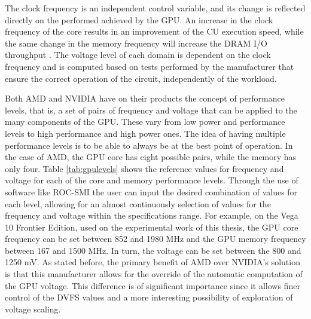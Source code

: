 The clock frequency is an independent control variable, and its change is reflected directly on the performed achieved by the GPU. An increase in the clock frequency of the core results in an improvement of the CU execution speed, while the same change in the memory frequency will increase the DRAM I/O throughput \cite{mei_survey_2016}. The voltage level of each domain is dependent on the clock frequency and is computed based on tests performed by the manufacturer that ensure the correct operation of the circuit, independently of the workload.

Both AMD and NVIDIA have on their products the concept of performance levels, that is, a set of pairs of frequency and voltage that can be applied to the many components of the GPU. These vary from low power and performance levels to high performance and high power ones. The idea of having multiple performance levels is to be able to always be at the best point of operation.  In the case of AMD, the GPU core has eight possible pairs, while the memory has only four. Table \ref{tab:gpulevels} shows the reference values for frequency and voltage for each of the core and memory performance levels. Through the use of software like ROC-SMI \cite{noauthor_radeonopencompute/roc-smi_2019} the user can input the desired combination of values for each level, allowing for an almost continuously selection of values for the frequency and voltage within the specifications range. For example, on the Vega 10 Frontier Edition, used on the experimental work of this thesis, the GPU core frequency can be set between 852 and 1980 MHz and the GPU memory frequency between 167 and 1500 MHz. In turn, the voltage can be set between the 800 and 1250 mV. As stated before, the primary benefit of AMD over NVIDIA's solution is that this manufacturer allows for the override of the automatic computation of the GPU voltage. This difference is of significant importance since it allows finer control of the DVFS values and a more interesting possibility of exploration of voltage scaling.


